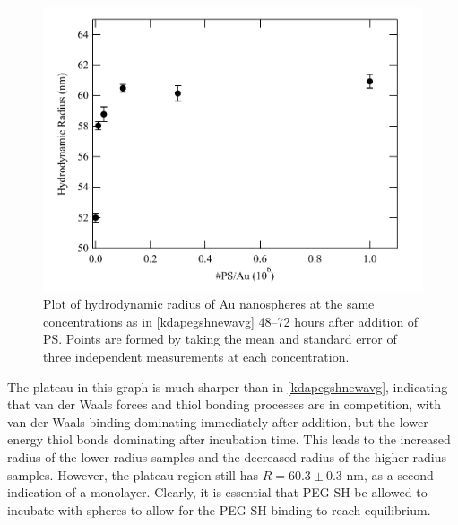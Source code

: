 \begin{figure}[htbp]
\centering
\includegraphics[keepaspectratio,width=\textwidth,height=0.75\textheight]{TimeAvg.pdf}
\caption{Plot of hydrodynamic radius of Au nanospheres at the same concentrations as in \autoref{kdapegshnewavg} 48--72 hours after addition of PS. Points are formed by taking the mean and standard error of three independent measurements at each concentration.}
\label{kdapegshtime}
\end{figure}



The plateau in this graph is much sharper than in \autoref{kdapegshnewavg}, indicating that van der Waals forces and thiol bonding processes are in competition, with van der Waals binding dominating immediately after addition, but the lower-energy thiol bonds dominating after incubation time. This leads to the increased radius of the lower-radius samples and the decreased radius of the higher-radius samples. However, the plateau region still has $R=60.3\pm0.3$ nm, as a second indication of a monolayer. Clearly, it is essential that PEG-SH be allowed to incubate with spheres to allow for the PEG-SH binding to reach equilibrium.

